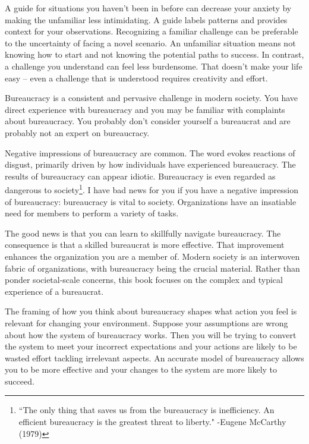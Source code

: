 
A guide for situations you haven't been in before can decrease your anxiety by making the unfamiliar less intimidating. 
A guide labels patterns and provides context for your observations. 
Recognizing a familiar challenge can be preferable to the uncertainty of facing a novel scenario. An unfamiliar situation means not knowing how to start and not knowing the potential paths to success. In contrast, a challenge you understand can feel less burdensome. That doesn't make your life easy -- even a challenge that is understood requires creativity and effort.

Bureaucracy is a consistent and pervasive challenge in modern society. You have direct experience with bureaucracy and you may be familiar with complaints about bureaucracy. You probably don't consider yourself a bureaucrat and are probably not an expert on bureaucracy.


Negative impressions of bureaucracy are common. The word
evokes reactions of disgust, primarily driven by how individuals have experienced bureaucracy.
The results of bureaucracy can appear idiotic.
Bureaucracy is even regarded as dangerous to society\footnote{``The only thing that saves us from the bureaucracy is inefficiency. An efficient bureaucracy is the greatest threat to liberty." -Eugene McCarthy (1979)}.
I have bad news for you if you have a negative impression of bureaucracy: bureaucracy is vital to society. 
Organizations have an insatiable need for members to perform a variety of tasks.

The good news is that you can learn to skillfully navigate bureaucracy. The consequence is that a skilled bureaucrat is more effective. That improvement enhances the organization you are a member of. Modern society is an interwoven fabric of organizations, with  bureaucracy being the crucial material.
Rather than ponder societal-scale concerns, this book focuses on the complex and typical experience of a bureaucrat. 


The framing of how you think about bureaucracy shapes what action you feel is relevant for changing your environment. 
Suppose your assumptions are wrong about how the system of bureaucracy works. Then you will be trying to convert the system to meet your incorrect expectations and your actions are likely to be wasted effort tackling irrelevant aspects. 
An accurate model of bureaucracy allows you to be more effective and your changes to the system are more likely to succeed. 

